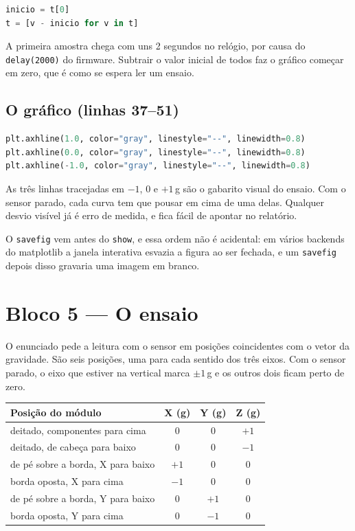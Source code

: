 \documentclass[11pt,a4paper]{article}
\begin{document}
\begin{lstlisting}[language=Python,firstnumber=34]
inicio = t[0]
t = [v - inicio for v in t]
\end{lstlisting}

A primeira amostra chega com uns 2 segundos no relógio, por causa do
\texttt{delay(2000)} do firmware. Subtrair o valor inicial de todos faz o
gráfico começar em zero, que é como se espera ler um ensaio.

\subsection{O gráfico (linhas 37--51)}

\begin{lstlisting}[language=Python,firstnumber=41]
plt.axhline(1.0, color="gray", linestyle="--", linewidth=0.8)
plt.axhline(0.0, color="gray", linestyle="--", linewidth=0.8)
plt.axhline(-1.0, color="gray", linestyle="--", linewidth=0.8)
\end{lstlisting}

As três linhas tracejadas em $-1$, 0 e $+1$\,g são o gabarito visual do
ensaio. Com o sensor parado, cada curva tem que pousar em cima de uma delas.
Qualquer desvio visível já é erro de medida, e fica fácil de apontar no
relatório.

O \texttt{savefig} vem antes do \texttt{show}, e essa ordem não é acidental:
em vários backends do matplotlib a janela interativa esvazia a figura ao ser
fechada, e um \texttt{savefig} depois disso gravaria uma imagem em branco.

\newpage
\section{Bloco 5 --- O ensaio}

O enunciado pede a leitura com o sensor em posições coincidentes com o vetor
da gravidade. São seis posições, uma para cada sentido dos três eixos. Com o
sensor parado, o eixo que estiver na vertical marca $\pm 1$\,g e os outros
dois ficam perto de zero.

\begin{center}
\begin{tabular}{@{}lccc@{}}
\toprule
\textbf{Posição do módulo} & \textbf{X (g)} & \textbf{Y (g)} & \textbf{Z (g)} \\
\midrule
deitado, componentes para cima    & 0    & 0    & $+1$ \\
deitado, de cabeça para baixo     & 0    & 0    & $-1$ \\
de pé sobre a borda, X para baixo & $+1$ & 0    & 0 \\
borda oposta, X para cima         & $-1$ & 0    & 0 \\
de pé sobre a borda, Y para baixo & 0    & $+1$ & 0 \\
borda oposta, Y para cima         & 0    & $-1$ & 0 \\
\bottomrule
\end{tabular}
\end{center}
\end{document}
